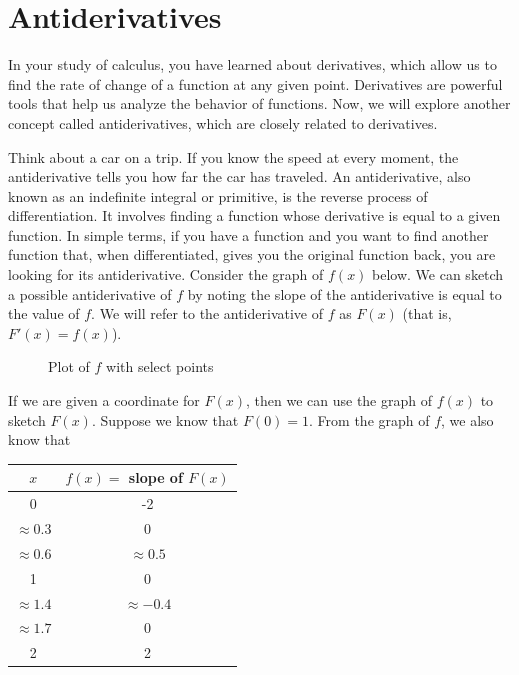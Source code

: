 \chapter{Antiderivatives}

In your study of calculus, you have learned about derivatives, which
allow us to find the rate of change of a function at any given
point. Derivatives are powerful tools that help us analyze the
behavior of functions. Now, we will explore another concept called
antiderivatives, which are closely related to derivatives.

Think about a car on a trip. If you know the speed at every moment, the antiderivative tells you how far the car has traveled. An antiderivative, also known as an indefinite integral or primitive, is the
reverse process of differentiation. It involves finding a function
whose derivative is equal to a given function. In simple terms, if you
have a function and you want to find another function that, when
differentiated, gives you the original function back, you are looking
for its antiderivative. Consider the graph of $f(x)$ below. We can 
sketch a possible antiderivative of $f$ by noting the slope of the 
antiderivative is equal to the value of $f$. We will refer to the 
antiderivative of $f$ as $F(x)$ (that is, $F'(x) = f(x)$).

\begin{figure}[htpb]
\centering
    \caption{Plot of $f$ with select points}
    \label{fig:fplot}
\end{figure}

If we are given a coordinate for $F(x)$, then we can use the 
graph of $f(x)$ to sketch $F(x)$. Suppose we know that $F(0) = 1$. 
From the graph of $f$, we also know that\\
\begin{center}
\begin{tabular}{|c|c|}\hline
    $x$ & $f(x)=$  slope of $F(x)$ \\
    \hline
    0 & -2\\
    \hline
    $\approx0.3$ & 0\\
    \hline
    $\approx0.6$ & $\approx0.5$\\
    \hline
    1 & 0\\
    \hline
    $\approx1.4$ & $\approx-0.4$\\
    \hline
    $\approx1.7$ & 0\\
    \hline
    2 & 2\\
    \hline
\end{tabular}
\end{center}

